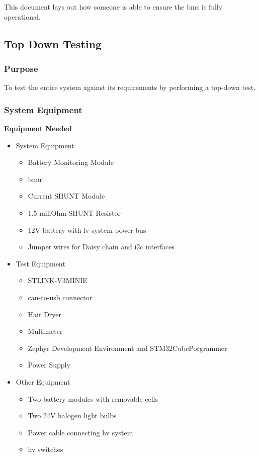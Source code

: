 This document lays out how someone is able to ensure the \gls{bms} is fully operational.

\subsection{Top Down Testing}

\subsubsection{Purpose}

To test the entire system against its requirements by performing a top-down test.

\subsubsection{System Equipment}

\textbf{Equipment Needed}
\begin{itemize}
	\item System Equipment
	\begin{itemize}
		\item Battery Monitoring Module
		\item \gls{bmu}
		\item Current SHUNT Module
		\item 1.5 miliOhm SHUNT Resistor
		\item 12V battery with \gls{lv} system power bus
		\item Jumper wires for Daisy chain and \gls{i2c} interfaces
	\end{itemize}
	\item Test Equipment
	\begin{itemize}
		\item STLINK-V3MINIE
		\item \gls{can}-to-\gls{usb} connector
		\item Hair Dryer
		\item Multimeter
		\item Zephyr Development Environment and STM32CubePorgrammer
		\item Power Supply
	\end{itemize}
	\item Other Equipment
	\begin{itemize}
		\item Two battery modules with removable cells
		\item Two 24V halogen light bulbs
		\item Power cable connecting \gls{hv} system
		\item \gls{hv} switches
	\end{itemize}
\end{itemize}

